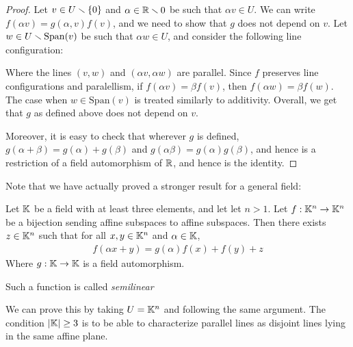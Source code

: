 \begin{proof}
  Let $v\in U\smallsetminus \{0\}$ and $\alpha \in \mathbb{R}\smallsetminus 0$ be such that 
  $\alpha v\in U$. We can write $f(\alpha v) = g(\alpha,v)f(v)$, and
  we need to show that $g$ does not depend on $v$. Let
  $w\in U\smallsetminus \mathrm{Span}(v)$ be such that $\alpha w\in U$, 
  and consider the following line configuration:
  \begin{figure}[!h]
    \centering
  \end{figure}


  Where the lines $(v,w)$ and $(\alpha v,\alpha w)$ are parallel. 
  Since $f$ preserves line configurations and paralellism, if 
  $f(\alpha v) = \beta f(v)$, then 
  $f(\alpha w) = \beta f(w)$. The case when 
  $w\in \mathrm{Span}(v)$ is treated similarly to additivity. 
  Overall, we get that $g$ as defined above 
  does not depend on $v$.

  Moreover, it is easy to check that wherever 
  $g$ is defined, $g(\alpha+\beta) = g(\alpha) + g(\beta)$ 
  and $g(\alpha\beta) = g(\alpha)g(\beta)$, and hence 
  is a restriction of a field 
  automorphism of $\mathbb{R}$, and hence is the identity.
\end{proof}
Note that we have actually proved a stronger result 
for a general field:
\begin{theorem}
  Let $\mathbb{K}$ be a field with at least three elements, and 
  let let $n>1$. Let $f:\mathbb{K}^n\to \mathbb{K}^n$ be a bijection sending 
  affine subspaces to affine subspaces. Then 
  there exists $z\in \mathbb{K}^n$ such that for all 
  $x,y\in \mathbb{K}^n$ and $\alpha\in \mathbb{K}$,
  \begin{align*}
    f(\alpha x + y) = g(\alpha)f(x) + f(y) + z
  \end{align*}
  Where $g:\mathbb{K}\to\mathbb{K}$ is a field automorphism.

  Such a function is called \textit{semilinear}
\end{theorem}
We can prove this by taking $U = \mathbb{K}^n$ and following the same argument. 
The condition $|\mathbb{K}|\ge 3$ is to be able to characterize 
parallel lines as disjoint lines lying in the same affine plane.

